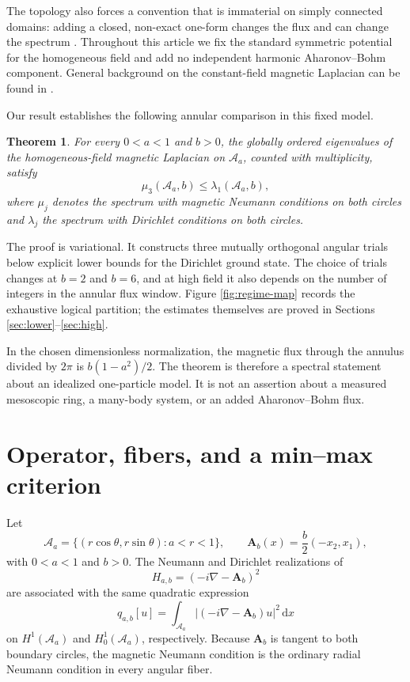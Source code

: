 \documentclass[11pt]{article}
\newtheorem{theorem}{Theorem}[section]
\newcommand{\Aa}{\mathcal A_a}
\newcommand{\dd}{\,\mathrm d}
\newcommand{\Afield}{\mathbf A_b}
\begin{document}
The topology also forces a convention that is immaterial on simply
connected domains: adding a closed, non-exact one-form changes the flux and
can change the spectrum \cite{ColboisEtAl2023}.  Throughout this article we
fix the standard symmetric potential for the homogeneous field and add no
independent harmonic Aharonov--Bohm component.  General background on the
constant-field magnetic Laplacian can be found in
\cite{FournaisHelffer2010}.

Our result establishes the following annular comparison in this fixed model.

\begin{theorem}\label{thm:main}
For every $0<a<1$ and $b>0$, the globally ordered eigenvalues of the
homogeneous-field magnetic Laplacian on $\Aa$, counted with multiplicity,
satisfy
\[
        \mu_3(\Aa,b)\leq \lambda_1(\Aa,b),
\]
where $\mu_j$ denotes the spectrum with magnetic Neumann conditions on both
circles and $\lambda_j$ the spectrum with Dirichlet conditions on both
circles.
\end{theorem}

The proof is variational.  It constructs three mutually orthogonal angular
trials below explicit lower bounds for the Dirichlet ground state.  The
choice of trials changes at $b=2$ and $b=6$, and at high field it also depends
on the number of integers in the annular flux window.  Figure
\ref{fig:regime-map} records the exhaustive logical partition; the estimates
themselves are proved in Sections \ref{sec:lower}--\ref{sec:high}.



In the chosen dimensionless normalization, the magnetic flux through the
annulus divided by $2\pi$ is $b(1-a^2)/2$.  The theorem is therefore a
spectral statement about an idealized one-particle model.  It is not an
assertion about a measured mesoscopic ring, a many-body system, or an added
Aharonov--Bohm flux.

\section{Operator, fibers, and a min--max criterion}\label{sec:model}

Let
\[
 \Aa=\{(r\cos\theta,r\sin\theta):a<r<1\},\qquad
 \Afield(x)=\frac b2(-x_2,x_1),
\]
with $0<a<1$ and $b>0$.  The Neumann and Dirichlet realizations of
\[
 H_{a,b}=(-i\nabla-\Afield)^2
\]
are associated with the same quadratic expression
\[
 q_{a,b}[u]=\int_{\Aa}|(-i\nabla-\Afield)u|^2\dd x
\]
on $H^1(\Aa)$ and $H^1_0(\Aa)$, respectively.  Because $\Afield$ is tangent
to both boundary circles, the magnetic Neumann condition is the ordinary
radial Neumann condition in every angular fiber.
\end{document}
